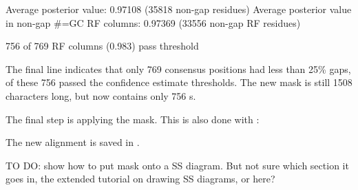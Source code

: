 
\begin{sreoutput}
Average posterior value:                            0.97108 (35818 non-gap residues)
Average posterior value in non-gap #=GC RF columns: 0.97369 (33556 non-gap RF residues)


756 of 769 RF columns (0.983) pass threshold
\end{sreoutput}

The final line indicates that only 769 consensus positions had less
than 25\% gaps, of these 756 passed the confidence estimate
thresholds. The new mask  is still 1508 characters
long, but now contains only 756 s.

The final step is applying the mask. This is also done with
:


The new alignment is saved in .

TO DO: show how to put mask onto a SS diagram. But not sure which
section it goes in, the extended tutorial on drawing SS diagrams, or
here? 










